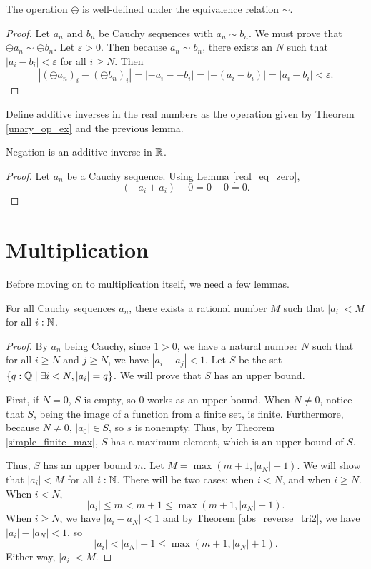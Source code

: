\documentclass[../../math.tex]{subfiles}
\begin{document}
\begin{lemma}
    The operation $\ominus$ is well-defined under the equivalence relation
    $\sim$.
\end{lemma}
\begin{proof}
    Let $a_n$ and $b_n$ be Cauchy sequences with $a_n \sim b_n$.  We must prove
    that $\ominus a_n \sim \ominus b_n$.  Let $\varepsilon > 0$.  Then because
    $a_n \sim b_n$, there exists an $N$ such that $|a_i - b_i| < \varepsilon$
    for all $i \geq N$.  Then
    \[
        |(\ominus a_n)_i - (\ominus b_n)_i|
        = |{-}a_i - -b_i|
        = |{-}(a_i - b_i)|
        = |a_i - b_i|
        < \varepsilon.
    \]
\end{proof}

\begin{instance}
    Define additive inverses in the real numbers as the operation given by
    Theorem \ref{unary_op_ex} and the previous lemma.
\end{instance}

\begin{instance}
    Negation is an additive inverse in $\mathbb{R}$.
\end{instance}
\begin{proof}
    Let $a_n$ be a Cauchy sequence.  Using Lemma \ref{real_eq_zero},
    \[
        (-a_i + a_i) - 0 = 0 - 0 = 0.
    \]
\end{proof}

\section{Multiplication}

Before moving on to multiplication itself, we need a few lemmas.

\begin{lemma} \label{real_cauchy_bounded}
    For all Cauchy sequences $a_n$, there exists a rational number $M$ such that
    $|a_i| < M$ for all $i : \mathbb{N}$.
\end{lemma}
\begin{proof}
    By $a_n$ being Cauchy, since $1 > 0$, we have a natural number $N$ such that
    for all $i \geq N$ and $j \geq N$, we have $|a_i - a_j| < 1$.  Let $S$ be
    the set $\{q : \mathbb{Q} \mid \exists i < N, |a_i| = q\}$.  We will prove that $S$
    has an upper bound.

    First, if $N = 0$, $S$ is empty, so $0$ works as an upper bound.  When $N
    \neq 0$, notice that $S$, being the image of a function from a finite set,
    is finite.  Furthermore, because $N \neq 0$, $|a_0| \in S$, so $s$ is
    nonempty.  Thus, by Theorem \ref{simple_finite_max}, $S$ has a maximum
    element, which is an upper bound of $S$.

    Thus, $S$ has an upper bound $m$.  Let $M = \max(m + 1, |a_N| + 1)$.  We
    will show that $|a_i| < M$ for all $i : \mathbb{N}$.  There will be two cases: when
    $i < N$, and when $i \geq N$.  When $i < N$,
    \[
        |a_i| \leq m < m + 1 \leq \max(m + 1, |a_N| + 1).
    \]
    When $i \geq N$, we have $|a_i - a_N| < 1$ and by Theorem
    \ref{abs_reverse_tri2}, we have $|a_i| - |a_N| < 1$, so
    \[
        |a_i| < |a_N| + 1 \leq \max(m + 1, |a_N| + 1).
    \]
    Either way, $|a_i| < M$.
\end{proof}
\end{document}
